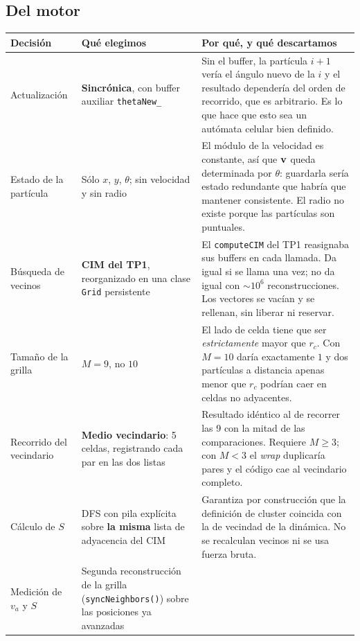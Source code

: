 \documentclass[11pt]{article}
\begin{document}
\subsection{Del motor}

\begin{center}
\begin{tabular}{p{3.5cm}p{4.4cm}p{5.6cm}}
  \toprule
  Decisión & Qué elegimos & Por qué, y qué descartamos \\
  \midrule
  Actualización &
  \textbf{Sincrónica}, con buffer auxiliar \texttt{thetaNew\_} &
  Sin el buffer, la partícula $i+1$ vería el ángulo nuevo de la $i$ y el resultado dependería del orden de recorrido, que es arbitrario. Es lo que hace que esto sea un autómata celular bien definido. \\
  \addlinespace
  Estado de la partícula &
  Sólo $x$, $y$, $\theta$; sin velocidad y sin radio &
  El módulo de la velocidad es constante, así que $\mathbf{v}$ queda determinada por $\theta$: guardarla sería estado redundante que habría que mantener consistente. El radio no existe porque las partículas son puntuales. \\
  \addlinespace
  Búsqueda de vecinos &
  \textbf{CIM del TP1}, reorganizado en una clase \texttt{Grid} persistente &
  El \texttt{computeCIM} del TP1 reasignaba sus buffers en cada llamada. Da igual si se llama una vez; no da igual con $\sim10^6$ reconstrucciones. Los vectores se vacían y se rellenan, sin liberar ni reservar. \\
  \addlinespace
  Tamaño de la grilla &
  $M = 9$, no $10$ &
  El lado de celda tiene que ser \emph{estrictamente} mayor que $r_c$. Con $M = 10$ daría exactamente $1$ y dos partículas a distancia apenas menor que $r_c$ podrían caer en celdas no adyacentes. \\
  \addlinespace
  Recorrido del vecindario &
  \textbf{Medio vecindario}: 5 celdas, registrando cada par en las dos listas &
  Resultado idéntico al de recorrer las 9 con la mitad de las comparaciones. Requiere $M \geq 3$; con $M < 3$ el \emph{wrap} duplicaría pares y el código cae al vecindario completo. \\
  \addlinespace
  Cálculo de $S$ &
  DFS con pila explícita sobre \textbf{la misma} lista de adyacencia del CIM &
  Garantiza por construcción que la definición de cluster coincida con la de vecindad de la dinámica. No se recalculan vecinos ni se usa fuerza bruta. \\
  \addlinespace
  Medición de $v_a$ y $S$ &
  Segunda reconstrucción de la grilla (\texttt{syncNeighbors()}) sobre las posiciones ya avanzadas &

\end{tabular}
\end{center}
\end{document}
